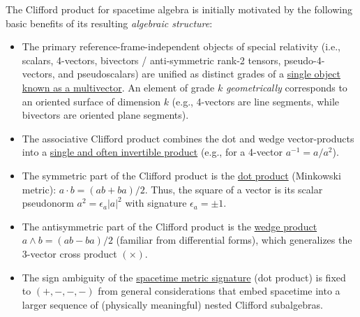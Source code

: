 \documentclass[1p,sort&compress]{elsarticle}
\numberwithin{equation}{section}
\begin{document}
The Clifford product for spacetime algebra is initially motivated by the following basic benefits of its resulting \emph{algebraic structure}:
\begin{itemize}
  \item The primary reference-frame-independent objects of special relativity (i.e., scalars, 4-vectors, bivectors / anti-symmetric rank-2 tensors, pseudo-4-vectors, and pseudoscalars) are unified as distinct grades of a \uline{single object known as a multivector}.  An element of grade $k$ \emph{geometrically} corresponds to an oriented surface of dimension $k$ (e.g., 4-vectors are line segments, while bivectors are oriented plane segments).
  \item The associative Clifford product combines the dot and wedge vector-products into a 
\uline{single and often invertible product} (e.g., for a 4-vector $a^{-1} = a/a^2$).
  \item The symmetric part of the Clifford product is the \uline{dot product} (Minkowski metric): $a \cdot b = (ab + ba)/2$.  Thus, the square of a vector is its scalar pseudonorm $a^2 = \epsilon_a|a|^2$ with signature $\epsilon_a = \pm 1$.
  \item The antisymmetric part of the Clifford product is the \uline{wedge product} $a\wedge b = (ab - ba)/2$ (familiar from differential forms), which generalizes the 3-vector cross product $(\times)$.
  \item The sign ambiguity of the \uline{spacetime metric signature} (dot product) is fixed to $(+,-,-,-)$ from general considerations that embed spacetime into a larger sequence of (physically meaningful) nested Clifford subalgebras.
\end{itemize}
\end{document}
